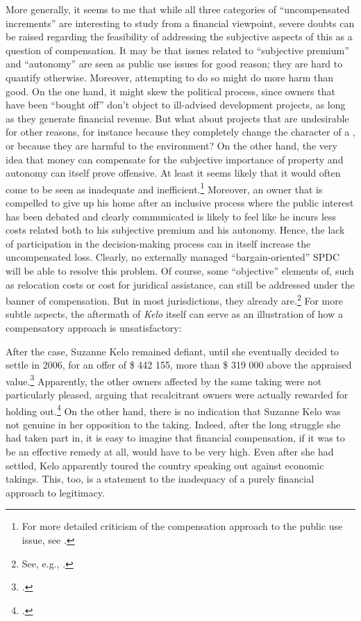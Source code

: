 More generally, it seems to me that while all three categories of ``uncompensated increments'' are interesting to study from a financial viewpoint, severe doubts can be raised regarding the feasibility of addressing the subjective aspects of this as a question of compensation. It may be that issues related to ``subjective premium'' and ``autonomy'' are seen as public use issues for good reason; they are hard to quantify otherwise. Moreover, attempting to do so might do more harm than good. On the one hand, it might skew the political process, since owners that have been ``bought off'' don't object to ill-advised development projects, as long as they generate financial revenue. But what about projects that are undesirable for other reasons, for instance because they completely change the character of a , or because they are harmful to the environment? On the other hand, the very idea that money can compensate for the subjective importance of property and autonomy can itself prove offensive. At least it seems likely that it would often come to be seen as inadequate and inefficient.\footnote{For more detailed criticism of the compensation approach to the public use issue, see \cite{garnett06}.} Moreover, an owner that is compelled to give up his home after an inclusive process where the public interest has been debated and clearly communicated is likely to feel like he incurs less costs related both to his subjective premium and his autonomy. Hence, the lack of participation in the decision-making process can in itself increase the uncompensated loss. Clearly, no externally managed ``bargain-oriented'' SPDC will be able to resolve this problem. Of course, some ``objective'' elements of, such as relocation costs or cost for juridical assistance, can still be addressed under the banner of compensation. But in most jurisdictions, they already are.\footnote{See, e.g., \cite[121-126]{garnett06}.} For more subtle aspects, the aftermath of {\it Kelo} itself can serve as an illustration of how a compensatory approach is unsatisfactory:

After the case, Suzanne Kelo remained defiant, until she eventually decided to settle in 2006, for an offer of \$ 442 155, more than \$ 319 000 above the appraised value.\footcite[1709]{lehavi07} Apparently, the other owners affected by the same taking were not particularly pleased, arguing that recalcitrant owners were actually rewarded for holding out.\footcite[1709]{lehavi07} On the other hand, there is no indication that Suzanne Kelo was not genuine in her opposition to the taking. Indeed, after the long struggle she had taken part in, it is easy to imagine that financial compensation, if it was to be an effective remedy at all, would have to be very high. Even after she had settled, Kelo apparently toured the country speaking out against economic takings. This, too, is a statement to the inadequacy of a purely financial approach to legitimacy. 

